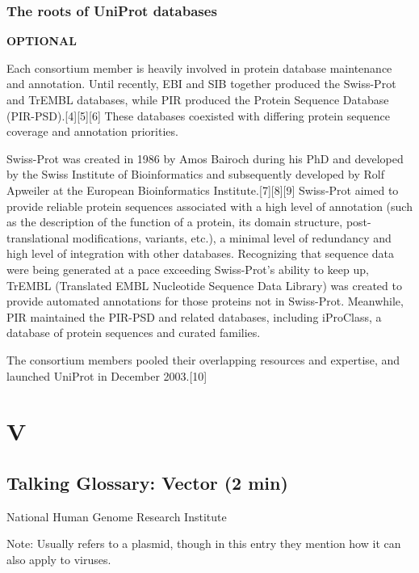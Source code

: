 \documentclass[
]{book}
\begin{document}
\hypertarget{the-roots-of-uniprot-databases}{%
\subsection{The roots of UniProt databases}\label{the-roots-of-uniprot-databases}}

\textbf{OPTIONAL}

Each consortium member is heavily involved in protein database maintenance and annotation. Until recently, EBI and SIB together produced the Swiss-Prot and TrEMBL databases, while PIR produced the Protein Sequence Database (PIR-PSD).{[}4{]}{[}5{]}{[}6{]} These databases coexisted with differing protein sequence coverage and annotation priorities.

Swiss-Prot was created in 1986 by Amos Bairoch during his PhD and developed by the Swiss Institute of Bioinformatics and subsequently developed by Rolf Apweiler at the European Bioinformatics Institute.{[}7{]}{[}8{]}{[}9{]} Swiss-Prot aimed to provide reliable protein sequences associated with a high level of annotation (such as the description of the function of a protein, its domain structure, post-translational modifications, variants, etc.), a minimal level of redundancy and high level of integration with other databases. Recognizing that sequence data were being generated at a pace exceeding Swiss-Prot's ability to keep up, TrEMBL (Translated EMBL Nucleotide Sequence Data Library) was created to provide automated annotations for those proteins not in Swiss-Prot. Meanwhile, PIR maintained the PIR-PSD and related databases, including iProClass, a database of protein sequences and curated families.

The consortium members pooled their overlapping resources and expertise, and launched UniProt in December 2003.{[}10{]}

\hypertarget{v}{%
\chapter{V}\label{v}}

\hypertarget{talking-glossary-vector-2-min}{%
\section{Talking Glossary: Vector (2 min)}\label{talking-glossary-vector-2-min}}

National Human Genome Research Institute

Note: Usually refers to a plasmid, though in this entry they mention how it can also apply to viruses.
\end{document}
